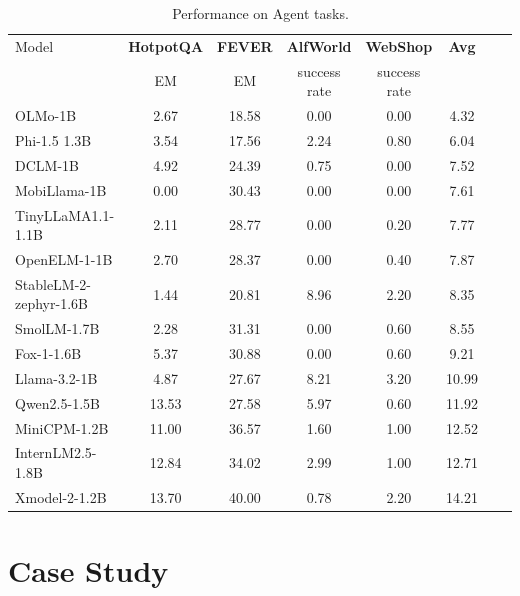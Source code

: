 \documentclass{article}
\newcommand{\llm}{Xmodel-2\xspace}
\begin{document}
\begin{table}[ht]
  \centering
  \setlength{\tabcolsep}{3pt}
  \begin{tabular}{lccccccc}
    \toprule
    Model & \textbf{HotpotQA} & \textbf{FEVER} & \textbf{AlfWorld} & \textbf{WebShop} & \textbf{Avg} \\
    & EM& EM& success rate & success rate \\
    \midrule
    \rowcolor{darkgreen!20}
    OLMo-1B\xspace   
    &2.67&18.58&0.00&0.00&4.32 \\
    \rowcolor{darkgreen!20}
    Phi-1.5 1.3B\xspace   
    &3.54&17.56&2.24&0.80&6.04 \\
    \rowcolor{darkgreen!20}
    DCLM-1B\xspace   
    &4.92&24.39&0.75&0.00&7.52 \\
    \rowcolor{darkgreen!20}
    MobiLlama-1B\xspace   
    &0.00&30.43&0.00&0.00&7.61 \\
    \rowcolor{darkgreen!20}
    TinyLLaMA1.1-1.1B\xspace   &2.11&28.77&0.00&0.20&7.77 \\
    \rowcolor{darkgreen!20}
    OpenELM-1-1B\xspace   
    &2.70&28.37&0.00&0.40&7.87 \\
    \rowcolor{darkgreen!20}
    StableLM-2-zephyr-1.6B\xspace  &1.44&20.81&8.96&2.20&8.35\\
    \rowcolor{darkgreen!20}
    SmolLM-1.7B\xspace  
    &2.28&31.31&0.00&0.60&8.55\\
    \rowcolor{darkgreen!20}
    Fox-1-1.6B\xspace   
    &5.37&30.88&0.00&0.60&9.21 \\
    \rowcolor{darkgreen!20}
    Llama-3.2-1B\xspace  &4.87&27.67&8.21&3.20&10.99 \\
    \rowcolor{darkgreen!20}
    Qwen2.5-1.5B\xspace &13.53&27.58&5.97&0.60&11.92 \\
    \rowcolor{darkgreen!20}
    MiniCPM-1.2B\xspace  &11.00&36.57&1.60&1.00&12.52 \\
    \rowcolor{darkgreen!20}
    InternLM2.5-1.8B\xspace  &12.84&34.02&2.99&1.00&12.71 \\
    \midrule
    \rowcolor{xdcolor!20}
    \llm-1.2B \xspace    &13.70&40.00&0.78&2.20&14.21 \\
    \bottomrule
  \end{tabular}
  \newline
  \caption{Performance on Agent tasks. }
  \label{tab:agent-capabilities}
\end{table}


\section{Case Study}
\label{sec:case study}
\end{document}
